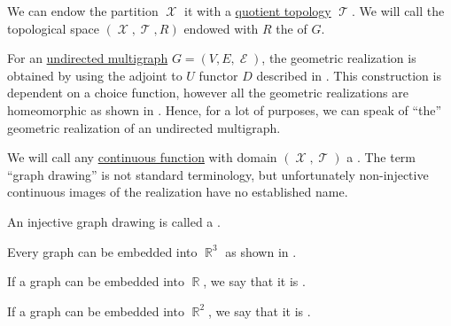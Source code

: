\begin{definition}
  We can endow the partition \( \mscrX \) it with a \hyperref[def:topological_quotient]{quotient topology} \( \mscrT \). We will call the topological space \( (\mscrX, \mscrT, R) \) endowed with \( R \) the  of \( G \).

  \begin{thmenum}
     For an \hyperref[def:undirected_multigraph]{undirected multigraph} \( G = (V, E, \mscrE) \), the geometric realization is obtained by using the adjoint to \( U \) functor \( D \) described in . This construction is dependent on a choice function, however all the geometric realizations are homeomorphic as shown in . Hence, for a lot of purposes, we can speak of \enquote{the} geometric realization of an undirected multigraph.

     We will call any \hyperref[def:global_continuity]{continuous function} with domain \( (\mscrX, \mscrT) \) a . The term \enquote{graph drawing} is not standard terminology, but unfortunately non-injective continuous images of the realization have no established name.

     An injective graph drawing is called a .

    Every graph can be embedded into \( \BbbR^3 \) as shown in .

     If a graph can be embedded into \( \BbbR \), we say that it is .

     If a graph can be embedded into \( \BbbR^2 \), we say that it is .
  \end{thmenum}
\end{definition}


